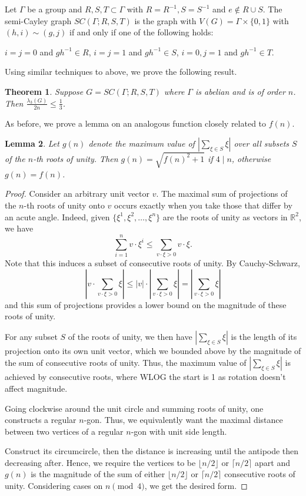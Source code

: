 \documentclass[12pt]{article}
\newcommand{\floor}[1]{\lfloor{#1\rfloor}}
\newcommand{\ceil}[1]{\lceil{#1\rceil}}
\newtheorem{thm}{Theorem}[section]
\newtheorem{lmm}[thm]{Lemma}
\begin{document}
Let $\Gamma$ be a group and $R, S, T \subset \Gamma$ with $R = R^{-1}, S = S^{-1}$ and $e \not \in R \cup S$. The semi-Cayley graph $SC(\Gamma; R, S, T)$ is the graph with $V(G) = \Gamma \times \{0, 1\}$ with $(h, i) \sim (g, j)$ if and only if one of the following holds:
\begin{outline}
    \1 $i = j = 0$ and $gh^{-1} \in R$,
    \1 $i = j = 1$ and $gh^{-1} \in S$,
    \1 $i = 0, j = 1$ and $gh^{-1} \in T$.
\end{outline}
Using similar techniques to above, we prove the following result.

\begin{thm}\label{thm:semi-cayley}
    Suppose $G = SC(\Gamma; R, S, T)$ where $\Gamma$ is abelian and is of order $n$. Then $\frac{\lambda_3(G)}{2n} \le \frac13$. 
\end{thm}

As before, we prove a lemma on an analogous function closely related to $f(n)$. 

\begin{lmm}\label{lmm:g-growth}
    Let $g(n)$ denote the maximum value of $|\sum_{\xi \in S} \xi|$ over all subsets $S$ of the $n$-th roots of unity. Then $g(n) = \sqrt{f(n)^2+1}$ if $4 \mid n$, otherwise $g(n) = f(n)$. 
\end{lmm}
\begin{proof}
    Consider an arbitrary unit vector $v$. The maximal sum of projections of the $n$-th roots of unity onto $v$ occurs exactly when you take those that differ by an acute angle. Indeed, given $\{\xi^1, \xi^2, \dots, \xi^n\}$ are the roots of unity as vectors in $\mathbb{R}^2$, we have
    \[\sum_{i = 1}^n v \cdot \xi^i \le \sum_{v \cdot \xi > 0} v \cdot \xi.\]
    Note that this induces a subset of consecutive roots of unity. By Cauchy-Schwarz, 
    \[\left|v \cdot \sum_{v \cdot \xi > 0} \xi\right| \le |v|\cdot \left|\sum_{v \cdot \xi > 0} \xi\right| = \left|\sum_{v \cdot \xi > 0} \xi\right|\]
    and this sum of projections provides a lower bound on the magnitude of these roots of unity. 

    For any subset $S$ of the roots of unity, we then have $|\sum_{\xi \in S} \xi|$ is the length of its projection onto its own unit vector, which we bounded above by the magnitude of the sum of consecutive roots of unity. Thus, the maximum value of $|\sum_{\xi \in S} \xi|$ is achieved by consecutive roots, where WLOG the start is 1 as rotation doesn't affect magnitude. 

    Going clockwise around the unit circle and summing roots of unity, one constructs a regular $n$-gon. Thus, we equivalently want the maximal distance between two vertices of a regular $n$-gon with unit side length. 

    Construct its circumcircle, then the distance is increasing until the antipode then decreasing after. Hence, we require the vertices to be $\floor{n/2}$ or $\ceil{n/2}$ apart and $g(n)$ is the magnitude of the sum of either $\floor{n/2}$ or $\ceil{n/2}$ consecutive roots of unity. Considering cases on $n \pmod{4}$, we get the desired form.
\end{proof}
\end{document}
